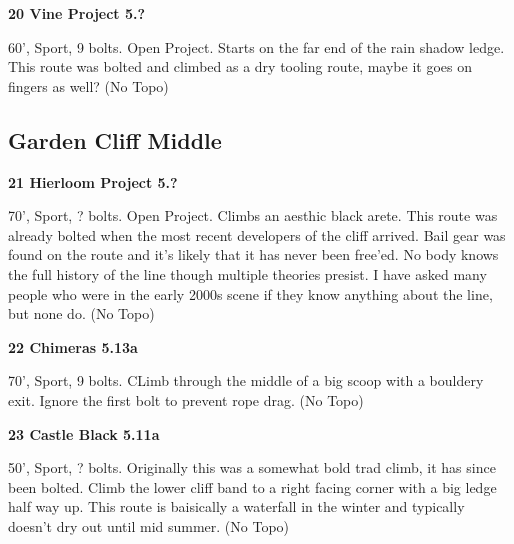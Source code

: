 \begin{multicols}{2}
\needspace{1.5cm}
\label{rt:Vine Project}
\colorbox{black!20}{
\parbox{0.95\linewidth}{
\textbf{
20 Vine Project 5.?  
}}}

\begin{adjustwidth}{0.5cm}{}			
60', Sport, 9 bolts. Open Project. Starts on the far end of the rain shadow ledge. This route was bolted and climbed as a dry tooling route, maybe it goes on fingers as well? (No Topo)
\end{adjustwidth}




\needspace{1.5cm}
\subsection*{Garden Cliff Middle}\label{bf:Garden Cliff Middle}
	


\needspace{1.5cm}
\label{rt:Hierloom Project}
\colorbox{black!20}{
\parbox{0.95\linewidth}{
\textbf{
21 Hierloom Project 5.?  
}}}

\begin{adjustwidth}{0.5cm}{}			
70', Sport, ? bolts. Open Project. Climbs an aesthic black arete. This route was already bolted when the most recent developers of the cliff arrived. Bail gear was found on the route and it's likely that it has never been free'ed. No body knows the full history of the line though multiple theories presist. I have asked many people who were in the early 2000s scene if they know anything about the line, but none do. (No Topo)
\end{adjustwidth}



\needspace{1.5cm}
\label{rt:Chimeras}
\colorbox{Goldenrod!50}{
\parbox{0.95\linewidth}{
\textbf{
22 Chimeras 5.13a  
}}}

\begin{adjustwidth}{0.5cm}{}			
70', Sport, 9 bolts. CLimb through the middle of a big scoop with a bouldery exit. Ignore the first bolt to prevent rope drag. (No Topo)
\end{adjustwidth}



\needspace{1.5cm}
\label{rt:Castle Black}
\colorbox{RoyalBlue!20}{
\parbox{0.95\linewidth}{
\textbf{
23 Castle Black 5.11a  
}}}

\begin{adjustwidth}{0.5cm}{}			
50', Sport, ? bolts. Originally this was a somewhat bold trad climb, it has since been bolted. Climb the lower cliff band to a right facing corner with a big ledge half way up. This route is baisically a waterfall in the winter and typically doesn't dry out until mid summer. (No Topo)
\end{adjustwidth}




\end{multicols}
